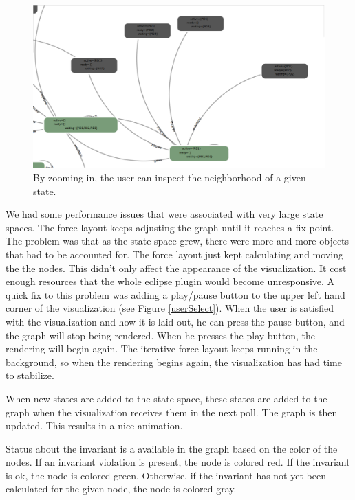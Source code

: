 \begin{center}
\begin{figure}[h!]
\includegraphics[width=14cm]{bilder/ss-neighborhood.png}
\caption{By zooming in, the user can inspect the neighborhood of a given state.}
\label{neighborhood}
\end{figure}
\end{center}

We had some performance issues that were associated with very large state spaces. The force layout keeps adjusting the graph until it reaches a fix point. The problem was that as the state space grew, there were more and more objects that had to be accounted for. The force layout just kept calculating and moving the the nodes. This didn't only affect the appearance of the visualization. It cost enough resources that the whole eclipse plugin would become unresponsive. A quick fix to this problem was adding a play/pause button to the upper left hand corner of the visualization (see Figure \ref{userSelect}). When the user is satisfied with the visualization and how it is laid out, he can press the pause button, and the graph will stop being rendered. When he presses the play button, the rendering will begin again. The iterative force layout keeps running in the background, so when the rendering begins again, the visualization has had time to stabilize.

When new states are added to the state space, these states are added to the graph when the visualization receives them in the next poll. The graph is then updated. This results in a nice animation.

Status about the invariant is a available in the graph based on the color of the nodes. If an invariant violation is present, the node is colored red. If the invariant is ok, the node is colored green. Otherwise, if the invariant has not yet been calculated for the given node, the node is colored gray.

